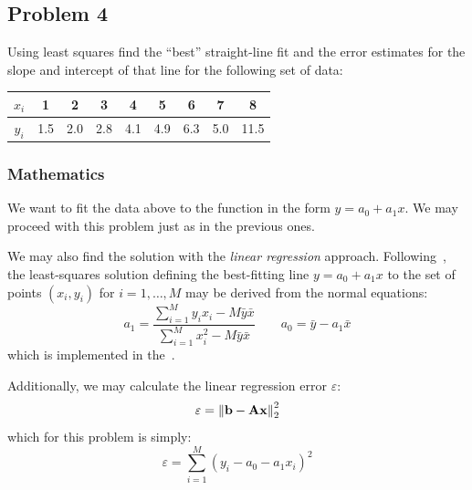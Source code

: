 \subsection{Problem 4}%
\label{sec:problem_4}
Using least squares find the ``best'' straight-line fit and the error estimates for the
slope and intercept of that line for the following set of data:
\begin{center}
  \begin{tabular}{|c|c|c|c|c|c|c|c|c|}
    \hline
    $x_i$ & 1 & 2 & 3 & 4 & 5 & 6 & 7 & 8 \\
    \hline
    $y_i$ & 1.5 & 2.0 & 2.8 & 4.1 & 4.9 & 6.3 & 5.0 & 11.5 \\
    \hline
  \end{tabular}
\end{center}
\subsubsection*{Mathematics}
We want to fit the data above to the function in the form $y = a_0 + a_1x$.
We may proceed with this problem just as in the previous ones.

We may also find the solution with the \textit{linear regression} approach.
Following~\cite{Zdunek}, the least-squares solution defining the best-fitting line
$y = a_0 + a_1x$ to the set of points $(x_i, y_i)$ for $i=1,\ldots,M$ may be derived from
the normal equations:
\begin{equation*}
a_1 = \frac{\sum_{i=1}^M{y_i x_i}-M\bar{y}\bar{x}}{\sum_{i=1}^M{x_i^2}-M\bar{y}\bar{x}}
\qquad a_0 = \bar{y} - a_1\bar{x}
\end{equation*}
which is implemented in the~.

Additionally, we may calculate the linear regression error $\varepsilon$:
\begin{equation*}
  \varepsilon = \left\lVert\mathbf{b}-\mathbf{A}\mathbf{x}\right\rVert_2^2
\end{equation*}
which for this problem is simply:
\begin{equation*}
  \varepsilon = \sum_{i=1}^M{{\left(y_i-a_0-a_1x_i\right)}^2}
\end{equation*}
